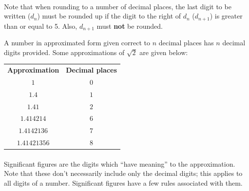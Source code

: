 \documentclass[12pt, a4paper, titlepage, twoside]{article}
\begin{document}
	\paragraph{}
	Note that when rounding to a number of decimal places, the last digit to be written ($d_n$) must be rounded up if the 
	digit to the right of $d_n$ ($d_{n+1}$) is greater than or equal to 5. Also, $d_{n+1}$ must \textbf{not} be rounded.\\
	
	\begin{kp}
		A number in approximated form given correct to $n$ decimal places has $n$ decimal digits provided. Some
		approximations of $\sqrt{2}$ are given below:
		
		\begin{longtable}{|c|c|}
			\hline
			\textbf{Approximation} & \textbf{Decimal places}\\
			\hhline{|=|=|}
			$1$ & $0$\\
			\hline
			$1.4$ & $1$\\
			\hline
			$1.41$ & $2$\\
			\hline
			$1.414214$ & $6$\\
			\hline
			$1.4142136$ & $7$\\
			\hline
			$1.41421356$ & $8$\\
			\hline
		\end{longtable}
	\end{kp}
	
	\paragraph{}
	Significant figures are the digits which ``have meaning'' to the approximation. Note that these don't necessarily include
	only the decimal digits; this applies to all digits of a number. Significant figures have a few rules associated with them.\\
\end{document}
